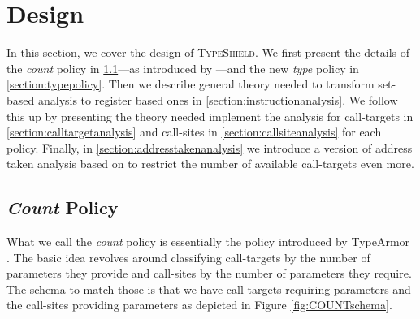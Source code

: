 \section{Design}
\label{chapter:Design}

In this section, we cover the design of \textsc{TypeShield}. We first present the details of the 
\emph{count} policy in \cref{section:countpolicy}---as introduced by \cite{veen:typearmor}---and the
new \emph{type} policy in \cref{section:typepolicy}. 
Then we describe general 
theory needed to transform set-based analysis to register based ones in \cref{section:instructionanalysis}. 
We follow this up by presenting the theory needed  implement the analysis for call-targets  in 
\cref{section:calltargetanalysis} and  call-sites in \cref{section:callsiteanalysis} 
for each policy. 
Finally, in \cref{section:addresstakenanalysis} we introduce a version of 
address taken analysis based on \cite{mingwei:sekar} to restrict the number of available call-targets even more. 

\subsection{\emph{Count} Policy}
\label{section:countpolicy}
What we call the \emph{count} policy is essentially the policy introduced by TypeArmor \cite{veen:typearmor}. 
The basic idea revolves around classifying call-targets by the number of parameters they provide and call-sites 
by the number of parameters they require. The schema to match those is that we have call-targets requiring 
parameters and the call-sites providing parameters as depicted in Figure \ref{fig:COUNTschema}.

